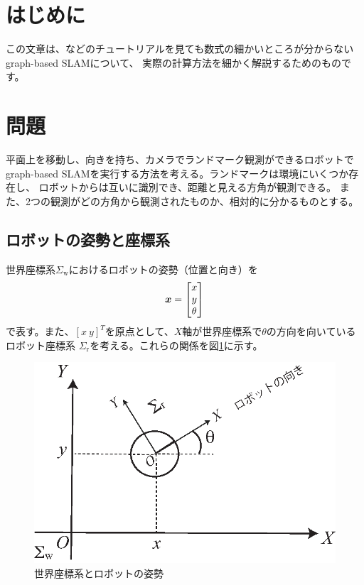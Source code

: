 \section{はじめに}

この文章は、\cite{grisetti2010}などのチュートリアルを見ても数式の細かいところが分からない
graph-based SLAMについて、
実際の計算方法を細かく解説するためのものです。

\section{問題}

平面上を移動し、向きを持ち、カメラでランドマーク観測ができるロボットで
graph-based SLAMを実行する方法を考える。ランドマークは環境にいくつか存在し、
ロボットからは互いに識別でき、距離と見える方角が観測できる。
また、2つの観測がどの方角から観測されたものか、相対的に分かるものとする。

\subsection{ロボットの姿勢と座標系}

世界座標系$\Sigma_\text{w}$におけるロボットの姿勢（位置と向き）を
\begin{align}
	\boldsymbol{x} =
	\begin{bmatrix}
		x \\ y \\ \theta
	\end{bmatrix}
\end{align}
で表す。また、$[x\ y]^T$を原点として、$X$軸が世界座標系で$\theta$の方向を向いているロボット座標系
$\Sigma_\text{r}$を考える。これらの関係を図\ref{fig:coordinate}に示す。

\begin{figure}[htbp]
	\begin{center}
		\includegraphics[width=0.5\linewidth]{./figs/coordinate.eps}
		\caption{世界座標系とロボットの姿勢}
		\label{fig:coordinate}
	\end{center}
\end{figure}

